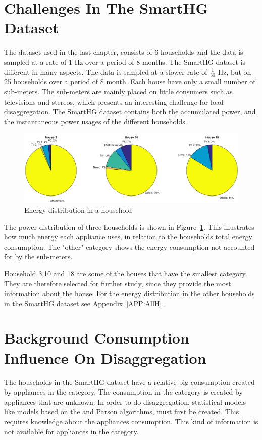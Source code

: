 \section{Challenges In The SmartHG Dataset} 
The  dataset used in the last chapter, consists of 6 households and the data is sampled at a rate of 1 Hz over a period of 8 months. The SmartHG dataset is different in many aspects. The data is sampled at a slower rate of $\frac{1}{30}$ Hz, but on 25 households over a period of 8 month. Each house have only a small number of sub-meters. The sub-meters are mainly placed on little consumers such as televisions and stereos, which presents an interesting challenge for load disaggregation. The SmartHG dataset contains both the accumulated power, and the instantaneous power usages of the different households.

\begin{figure}[H]
\centering
\includegraphics[width=1\textwidth]{billeder/TotalPie.png}
\caption{Energy distribution in a household}
\label{fig:SLC}
\end{figure}

The power distribution of three households is shown in Figure~\ref{fig:SLC}. This illustrates how much energy each appliance uses, in relation to the households total energy consumption. The "other" category shows the energy consumption not accounted for by the sub-meters.  

Household 3,10 and 18 are some of the houses that have the smallest  category. They are therefore selected for further study, since they provide the most information about the house. For the energy distribution in the other households in the SmartHG dataset see Appendix~\ref{APP:AllH}. 

\section{Background Consumption Influence On Disaggregation}
\label{sec:AppNoise}
The households in the SmartHG dataset have a relative big consumption created by appliances in the  category. The consumption in the  category is created by appliances that are unknown. In order to do disaggregation, statistical models like models based on the  and Parson algorithms, must first be created. This requires knowledge about the appliances consumption. This kind of information is not available for appliances in the  category. 

